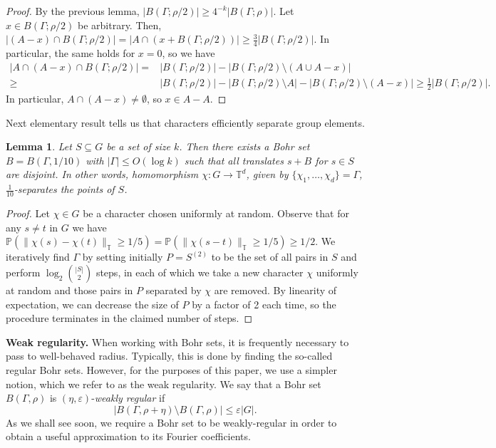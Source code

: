 \documentclass[a4paper,11pt]{article}
\numberwithin{theorem}{section}
\newtheorem{lemma}[theorem]{Lemma}
\theoremstyle{definition}
\newcommand{\uc}[1]{
    \|#1\|_{\mathbb{T}}
}
\begin{document}
\begin{proof}
    By the previous lemma, $|B(\Gamma; \rho/2)| \geq 4^{-k}|B(\Gamma; \rho)|$. Let $x \in B(\Gamma; \rho/2)$ be arbitrary. Then, $|(A - x) \cap B(\Gamma; \rho/2)| = |A \cap (x + B(\Gamma; \rho/2))| \geq \frac{3}{4}|B(\Gamma; \rho/2)|$. In particular, the same holds for $x = 0$, so we have
    \begin{align*}|A\cap (A - x) \cap B(\Gamma; \rho/2)| = & |B(\Gamma; \rho/2)| - |B(\Gamma; \rho/2) \setminus (A \cup A - x)|\\
    \geq &|B(\Gamma; \rho/2)| - |B(\Gamma; \rho/2) \setminus A| - |B(\Gamma; \rho/2) \setminus (A - x)| \geq \frac{1}{2}|B(\Gamma; \rho/2)|.\end{align*}
    In particular, $A\cap (A - x) \not= \emptyset$, so $x \in A - A$.
\end{proof}

Next elementary result tells us that characters efficiently separate group elements.

\begin{lemma}\label{charseparation}
    Let $S \subseteq G$ be a set of size $k$. Then there exists a Bohr set $B = B(\Gamma, 1/10)$ with $|\Gamma| \leq O(\log k)$ such that all translates $s + B$ for $s \in S$ are disjoint. In other words, homomorphism $\chi : G \to \mathbb{T}^d$, given by $\{\chi_1, \dots, \chi_d\} = \Gamma$, $\frac{1}{10}$-separates the points of $S$.
\end{lemma}

\begin{proof}
    Let $\chi \in \hat{G}$ be a character chosen uniformly at random. Observe that for any $s \not= t$ in $G$ we have $\mathbb{P}(\uc{\chi(s) - \chi(t)} \geq 1/5) = \mathbb{P}(\uc{\chi(s - t)} \geq 1/5) \geq 1/2$. We iteratively find $\Gamma$ by setting initially $P = S^{(2)}$ to be the set of all pairs in $S$ and perform $\log_2 \binom{ |S|}{2}$ steps, in each of which we take a new character $\chi$ uniformly at random and those pairs in $P$ separated by $\chi$ are removed. By linearity of expectation, we can decrease the size of $P$ by a factor of 2 each time, so the procedure terminates in the claimed number of steps. 
\end{proof}

\noindent\textbf{Weak regularity.} When working with Bohr sets, it is frequently necessary to pass to well-behaved radius. Typically, this is done by finding the so-called regular Bohr sets. However, for the purposes of this paper, we use a simpler notion, which we refer to as the weak regularity. We say that a Bohr set $B(\Gamma, \rho)$ is $(\eta, \varepsilon)$-\textit{weakly regular} if 
\[|B(\Gamma, \rho + \eta) \setminus B(\Gamma, \rho)| \leq \varepsilon |G|.\]
As we shall see soon, we require a Bohr set to be weakly-regular in order to obtain a useful approximation to its Fourier coefficients.\\
\end{document}

